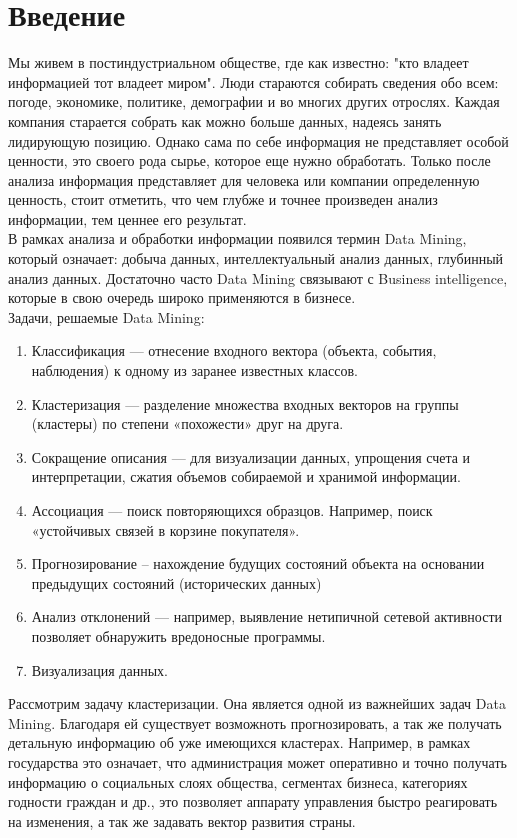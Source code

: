 \documentclass[a4paper]{article}
\begin{document}
\section{Введение}
 Мы живем в постиндустриальном обществе, где как известно: "кто владеет информацией тот владеет миром". Люди стараются собирать сведения обо всем: погоде, экономике, политике, демографии и во многих других отрослях. Каждая компания старается собрать как можно больше данных, надеясь занять лидирующую позицию. Однако сама по себе информация не представляет особой ценности, это своего рода сырье, которое еще нужно обработать. Только после анализа информация представляет для человека или компании определенную ценность, стоит отметить, что чем глубже и точнее произведен анализ информации, тем ценнее его результат. \\
 В рамках анализа и обработки информации появился термин Data Mining, который означает:  добыча данных, интеллектуальный анализ данных, глубинный анализ данных. Достаточно часто Data Mining связывают с Business intelligence, которые в свою очередь широко применяются в бизнесе.  \\
 Задачи, решаемые Data Mining:
 \begin{enumerate} 
\item Классификация — отнесение входного вектора (объекта, события, наблюдения) к одному из заранее известных классов.
\item Кластеризация — разделение множества входных векторов на группы (кластеры) по степени «похожести» друг на друга.
\item Сокращение описания — для визуализации данных, упрощения счета и интерпретации, сжатия объемов собираемой и хранимой информации.
\item Ассоциация — поиск повторяющихся образцов. Например, поиск «устойчивых связей в корзине покупателя».
\item Прогнозирование – нахождение будущих состояний объекта на основании предыдущих состояний (исторических данных)
\item Анализ отклонений — например, выявление нетипичной сетевой активности позволяет обнаружить вредоносные программы.
\item Визуализация данных.
\end{enumerate} 
Рассмотрим задачу кластеризации.  Она является одной из важнейших задач Data Mining. Благодаря ей существует возможноть прогнозировать, а так же получать детальную информацию об уже имеющихся кластерах. Например, в рамках государства это означает, что администрация может оперативно и точно получать информацию о социальных слоях общества, сегментах бизнеса, категориях годности граждан и др., это позволяет аппарату управления быстро реагировать на изменения, а так же задавать вектор развития страны.
\end{document}
